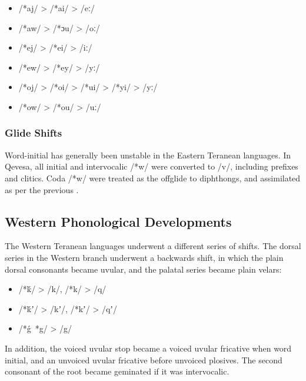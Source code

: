 \documentclass[grammar]{subfiles}
\begin{document}
\begin{description}
    \begin{itemize}
      \item /*aj/ > /*ai/ > /eː/
      \item /*aw/ > /*ɔu/ > /oː/
      \item /*ej/ > /*ei/ > /iː/
      \item /*ew/ > /*ey/ > /yː/
      \item /*oj/ > /*oi/ > /*ui/ > /*yi/ > /yː/
      \item /*ow/ > /*ou/ > /uː/
    \end{itemize}

\end{description}

\Tbw

\subsubsection{Glide Shifts}
\label{sssec:history:east:glide_shifts}

Word-initial  has generally been unstable in the Eastern Teranean
languages.  In Qevesa, all initial and intervocalic /*w/ were converted to /v/,
including prefixes and clitics.  Coda /*w/ were treated as the offglide to
diphthongs, and assimilated as per the previous
.

\Tbw
 
\subsection{Western Phonological Developments}
\label{ssec:history:western_developments}

The Western Teranean languages underwent a different series of shifts.  The
dorsal series in the Western branch underwent a backwards shift, in which the
plain dorsal consonants became uvular, and the palatal series became plain
velars: 

\begin{itemize}
  \item /*ḱ/ > /k/, /*k/ > /q/
  \item /*ḱʼ/ > /kʼ/, /*kʼ/ > /qʼ/
  \item /*ǵ~*g/ > /g/
\end{itemize}

In addition, the voiced uvular stop became a voiced uvular fricative when word
initial, and an unvoiced uvular fricative before unvoiced plosives.  The second
consonant of the root became geminated if it was intervocalic.
\end{document}
